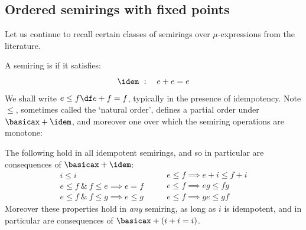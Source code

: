 \subsection{Ordered semirings with fixed points}
Let us continue to recall certain classes of semirings over $\mu$-expressions from the literature.

    A semiring is  if it satisfies:
    \[
    \idem\ : \quad  e + e = e
    \]
We shall write $e\leq f \df e+f = f$,
typically in the presence of idempotency.
Note $\leq$, sometimes called the `natural order', defines a partial order under $\basicax + \idem$, and moreover one over which the semiring operations are monotone:

\begin{proposition}
\label{props-of-nat-order}
    The following hold in all idempotent semirings, and so in particular are consequences of $\basicax + \idem$:
\begin{equation}
    \label{eq:mon-po}
    \begin{array}{c}
     i\leq i \\
     e \leq f \  \& \ f \leq e \implies e = f \\
     e \leq f \ \& \  f \leq g \implies e \leq g
\end{array}
\qquad
\begin{array}{l}
e\leq f \implies e+i \leq f+i \\ 
e\leq f \implies eg \leq fg \\
e \leq f \implies ge \leq gf
\end{array}
\end{equation}
Moreover these properties hold in \emph{any} semiring, as long as $i$ is idempotent, and in particular are consequences of $\basicax + (i+i=i)$.
\end{proposition}
